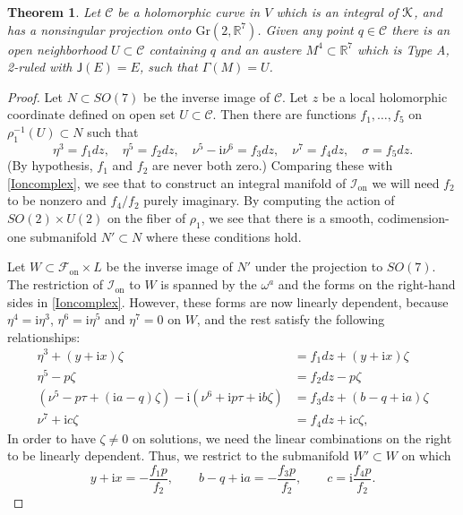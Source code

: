 \documentclass[12pt,reqno]{amsart}
\newtheorem{theorem}{Theorem}
\theoremstyle{definition}
\theoremstyle{remark}
\begin{document}
\begin{theorem}\label{AR7twist}  Let ${\mathscr C}$ be a holomorphic curve in $V$ which is an integral of ${{\EuScript K}}$, and
has a nonsingular projection onto ${{\mathrm{Gr}}}(2,{\mathbb R}^7)$.  Given any point $q\in {\mathscr C}$ there is an
open neighborhood $U\subset {\mathscr C}$ containing $q$ and an austere $M^4\subset {\mathbb R}^7$
which is Type A, 2-ruled with ${\mathsf J}(E)=E$, such that $\Gamma(M) = U$.
\end{theorem}

\begin{proof}Let $N\subset SO(7)$ be the inverse image of ${\mathscr C}$.  Let $z$ be a local
holomorphic coordinate defined on open set $U \subset {\mathscr C}$.  Then there are functions
$f_1, \ldots, f_5$ on $\rho_1^{-1}(U) \subset N$ such that
$$\eta^3 = f_1 dz, \quad \eta^5 = f_2 dz, \quad \nu^5-{\mathrm i} \nu^6 = f_3 dz, \quad
\nu^7 = f_4 dz, \quad \sigma = f_5 dz.$$
(By hypothesis, $f_1$ and $f_2$ are never both zero.) Comparing these with
\eqref{Ioncomplex}, we see that to construct an integral manifold of ${{{\mathcal I}}_{\operatorname{on}}}$ we
will need $f_2$ to be nonzero and $f_4/f_2$ purely imaginary.  By computing the action
of $SO(2)\times U(2)$ on the fiber of $\rho_1$, we see that there is a
smooth, codimension-one submanifold $N'\subset N$ where these conditions hold.

Let $W \subset {{\mathscr F}_{\operatorname{on}}} \times L$ be the inverse image of $N'$ under the
projection to $SO(7)$.  The restriction of ${{{\mathcal I}}_{\operatorname{on}}}$ to $W$ is spanned by
the ${\omega}^a$ and the forms on the right-hand sides in \eqref{Ioncomplex}.  However, these
forms are now linearly dependent, because $\eta^4={\mathrm i} \eta^3$, $\eta^6={\mathrm i} \eta^5$ and $\eta^7=0$ on $W$, and the rest
satisfy the following relationships:
\begin{align*}
\eta^3 + (y+{\mathrm i} x)\zeta &= f_1 dz + (y+{\mathrm i} x)\zeta\\
\eta^5 -p\zeta &= f_2 dz - p\zeta\\
(\nu^5 -p\tau +({\mathrm i} a-q)\zeta) -{\mathrm i}(\nu^6 +{\mathrm i} p\tau +{\mathrm i} b \zeta) &=
f_3 dz + (b-q + {\mathrm i} a) \zeta\\
\nu^7 +{\mathrm i} c \zeta &= f_4 dz+{\mathrm i} c\zeta,
\end{align*}
In order to have $\zeta\ne 0$ on solutions, we need the linear combinations on the
right to be linearly dependent.  Thus, we restrict to the submanifold $W' \subset W$ on which
\begin{equation}\label{wprimeq}
y+{\mathrm i} x = -\dfrac{f_1 p}{f_2},
\qquad b-q+{\mathrm i} a = -\dfrac{f_3 p}{f_2},
\qquad c={\mathrm i} \dfrac{f_4 p}{f_2}.
\end{equation}


\end{proof}
\end{document}
